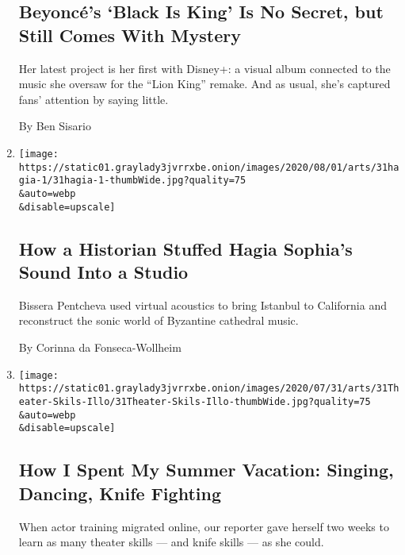 \begin{enumerate}
  \hypertarget{beyoncuxe9s-black-is-king-is-no-secret-but-still-comes-with-mystery}{%
  \subsection{Beyoncé's `Black Is King' Is No Secret, but Still Comes
  With
  Mystery}\label{beyoncuxe9s-black-is-king-is-no-secret-but-still-comes-with-mystery}}

  Her latest project is her first with Disney+: a visual album connected
  to the music she oversaw for the ``Lion King'' remake. And as usual,
  she's captured fans' attention by saying little.

  By Ben Sisario
\item
  \href{/2020/07/30/arts/music/hagia-sophia-acoustics-music.html}{}

  \texttt{[image: https://static01.graylady3jvrrxbe.onion/images/2020/08/01/arts/31hagia-1/31hagia-1-thumbWide.jpg?quality=75\\\&auto=webp\\\&disable=upscale]}

  \hypertarget{how-a-historian-stuffed-hagia-sophias-sound-into-a-studio}{%
  \subsection{How a Historian Stuffed Hagia Sophia's Sound Into a
  Studio}\label{how-a-historian-stuffed-hagia-sophias-sound-into-a-studio}}

  Bissera Pentcheva used virtual acoustics to bring Istanbul to
  California and reconstruct the sonic world of Byzantine cathedral
  music.

  By Corinna da Fonseca-Wollheim
\item
  \href{/2020/07/30/theater/theater-classes-at-home.html}{}

  \texttt{[image: https://static01.graylady3jvrrxbe.onion/images/2020/07/31/arts/31Theater-Skils-Illo/31Theater-Skils-Illo-thumbWide.jpg?quality=75\\\&auto=webp\\\&disable=upscale]}

  \hypertarget{how-i-spent-my-summer-vacation-singing-dancing-knife-fighting}{%
  \subsection{How I Spent My Summer Vacation: Singing, Dancing, Knife
  Fighting}\label{how-i-spent-my-summer-vacation-singing-dancing-knife-fighting}}

  When actor training migrated online, our reporter gave herself two
  weeks to learn as many theater skills --- and knife skills --- as she
  could.


\end{enumerate}
